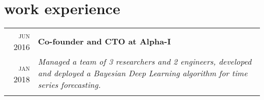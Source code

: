 \documentclass[a4paper,10pt]{article}
\begin{document}
\section{work experience}
\begin{tabular}{r|p{11cm}}
\textsc{jun 2016} & \textbf{Co-founder and CTO at Alpha-I} \\
\textsc{jan 2018} & \emph{Managed a team of 3 researchers and 2 engineers, developed and deployed a Bayesian Deep Learning algorithm for time series forecasting.}\\
&\small{
\begin{itemize}

\end{itemize}}
\end{tabular}
\end{document}

